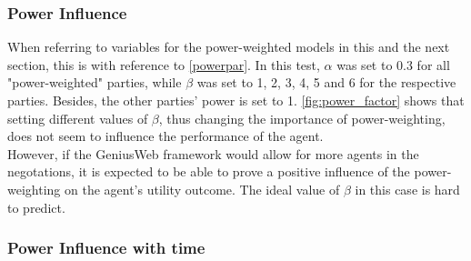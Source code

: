         \subsubsection{Power Influence}
        

   
            When referring to variables for the power-weighted models in this and the next section, this is with reference to \autoref{powerpar}.
            In this test, $\alpha$ was set to 0.3 for all "power-weighted" parties, while $\beta$ was set to 1, 2, 3, 4, 5 and 6 for the respective parties. Besides, the other parties' power is set to 1. \autoref{fig:power_factor} shows that setting different values of $\beta$, thus changing the importance of power-weighting, does not seem to influence the performance of the agent.\\
            
            However, if the GeniusWeb framework would allow for more agents in the negotations, it is expected to be able to prove a positive influence of the power-weighting on the agent's utility outcome. The ideal value of $\beta$ in this case is hard to predict.
            
            
            
       \subsubsection{Power Influence with time}
       
